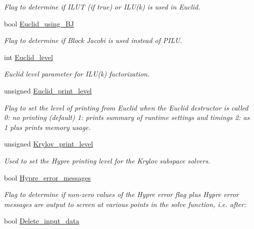 \begin{DoxyCompactItemize}
\begin{DoxyCompactList}\small\item\em Flag to determine if I\+L\+UT (if true) or I\+L\+U(k) is used in Euclid. \end{DoxyCompactList}\item 
bool \hyperlink{classoomph_1_1HypreInterface_a1405f23d6ffdf4afe2839434a3f738e0}{Euclid\+\_\+using\+\_\+\+BJ}
\begin{DoxyCompactList}\small\item\em Flag to determine if Block Jacobi is used instead of P\+I\+LU. \end{DoxyCompactList}\item 
int \hyperlink{classoomph_1_1HypreInterface_a0ae9320b5116bb330ddd1096d20f556e}{Euclid\+\_\+level}
\begin{DoxyCompactList}\small\item\em Euclid level parameter for I\+L\+U(k) factorization. \end{DoxyCompactList}\item 
unsigned \hyperlink{classoomph_1_1HypreInterface_adc83c27b78ac44ccdba2a85191e474c1}{Euclid\+\_\+print\+\_\+level}
\begin{DoxyCompactList}\small\item\em Flag to set the level of printing from Euclid when the Euclid destructor is called 0\+: no printing (default) 1\+: prints summary of runtime settings and timings 2\+: as 1 plus prints memory usage. \end{DoxyCompactList}\item 
unsigned \hyperlink{classoomph_1_1HypreInterface_a901fbdfa98992faf1cdae4d2d1ac9a2b}{Krylov\+\_\+print\+\_\+level}
\begin{DoxyCompactList}\small\item\em Used to set the Hypre printing level for the Krylov subspace solvers. \end{DoxyCompactList}\item 
bool \hyperlink{classoomph_1_1HypreInterface_aa0570d52546893f0767060c6efcd4090}{Hypre\+\_\+error\+\_\+messages}
\begin{DoxyCompactList}\small\item\em Flag to determine if non-\/zero values of the Hypre error flag plus Hypre error messages are output to screen at various points in the solve function, i.\+e. after\+: \end{DoxyCompactList}\item 
bool \hyperlink{classoomph_1_1HypreInterface_a0117cae635c9242ccfd9ad7153511c07}{Delete\+\_\+input\+\_\+data}

\end{DoxyCompactItemize}
